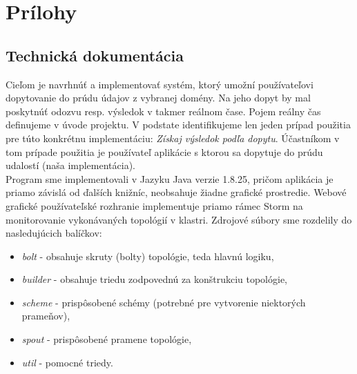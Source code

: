 \label{app.01}
\appendix
\chapter*{Prílohy}
\renewcommand{\thesection}{\Alph{section}}


\section{Technická dokumentácia}\label{p-tech-doku}
Cieľom je navrhnúť a implementovať systém, ktorý umožní používateľovi dopytovanie do prúdu údajov z vybranej domény. Na jeho dopyt by mal poskytnúť odozvu resp. výsledok v takmer reálnom čase. Pojem reálny čas definujeme v úvode projektu. V podstate identifikujeme len jeden prípad použitia pre túto konkrétnu implementáciu: \textit{Získaj výsledok podľa dopytu}. Účastníkom v tom prípade použitia je používateľ aplikácie s ktorou sa dopytuje do prúdu udalostí (naša implementácia).
\\[5pt]
Program sme implementovali v Jazyku Java verzie 1.8.25, pričom aplikácia je priamo závislá od ďalších knižníc, neobsahuje žiadne grafické prostredie. Webové grafické používateľské rozhranie implementuje priamo rámec Storm na monitorovanie vykonávaných topológií v klastri. Zdrojové súbory sme rozdelily do nasledujúcich balíčkov: 
\begin{itemize}
	\item \textit{bolt} - obsahuje skruty (bolty) topológie, teda hlavnú logiku,
	\item \textit{builder} - obsahuje triedu zodpovednú za konštrukciu topológie,
	\item \textit{scheme} - prispôsobené schémy (potrebné pre vytvorenie niektorých prameňov),
	\item \textit{spout} - prispôsobené pramene topológie,
	\item \textit{util} - pomocné triedy.
\end{itemize}

